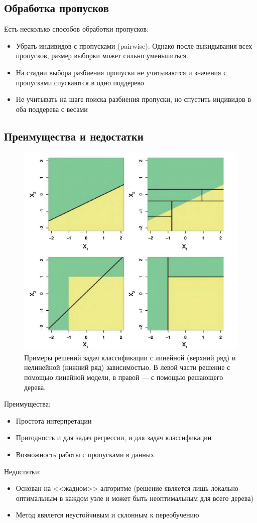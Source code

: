 \documentclass{article}
\theoremstyle{definition}
\theoremstyle{theorem}
\theoremstyle{remark}
\theoremstyle{theorem}
\theoremstyle{example}
\theoremstyle{theorem}
\theoremstyle{theorem}
\theoremstyle{theorem}
\theoremstyle{theorem}
\begin{document}
	\subsection{Обработка пропусков}
		Есть несколько способов обработки пропусков:
		\begin{itemize}
			\item Убрать индивидов с пропусками (pairwise). Однако после выкидывания всех пропусков, размер выборки может сильно уменьшиться.
			\item На стадии выбора разбиения пропуски не учитываются и значения с пропусками спускаются в одно поддерево
			\item Не учитывать на шаге поиска разбиения пропуски, но спустить индивидов в оба поддерева с весами
		\end{itemize}
	\newpage
	\subsection{ Преимущества и недостатки}
		\begin{figure}[h!]
			\includegraphics[width=\textwidth]{linreg_vs_tree}\caption{Примеры решений задач классификации с линейной (верхний ряд) и нелинейной (нижний ряд) зависимостью. В левой части решение с помощью линейной модели, в правой --- с помощью  решающего дерева.}
		\end{figure}
		Преимущества:
\begin{itemize}
\item  Простота интерпретации
\item  Пригодность и для задач регрессии, и для задач классификации
\item  Возможность работы с пропусками в данных
\end{itemize}
Недостатки:
\begin{itemize}
\item Основан на <<жадном>> алгоритме (решение является лишь локально оптимальным в каждом узле и может быть неоптимальным для всего дерева)
\item Метод явялется неустойчивым и склонным к переобучению
\end{itemize}
\newpage
\end{document}

